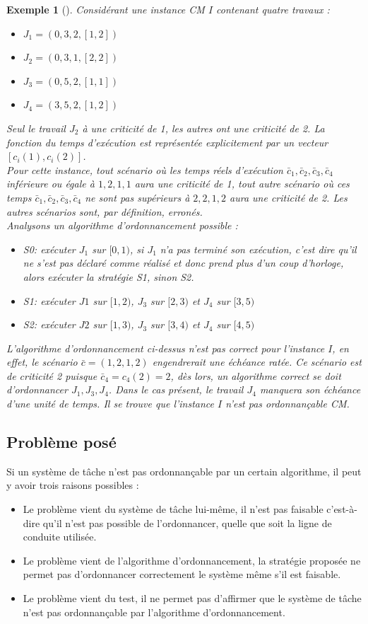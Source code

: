 \documentclass[a4paper]{report}
\theoremstyle{break}
\newtheorem{exem}{Exemple}
\theoremstyle{breakplain}
\begin{document}
\begin{exem}[\cite{baruah2010towards}]
Considérant une instance CM $I$ contenant quatre travaux :
\begin{itemize}
\item $J_1 = (0,3,2,[1,2])$
\item $J_2 = (0,3,1,[2,2])$
\item $J_3 = (0,5,2,[1,1])$
\item $J_4 = (3,5,2,[1,2])$
\end{itemize}
Seul le travail $J_2$ à une criticité de 1, les autres ont une criticité de 2. La fonction du temps d'exécution est représentée explicitement par un vecteur $[c_i(1), c_i(2)]$.\\
Pour cette instance, tout scénario où les temps réels d'exécution $\bar{c}_1,\bar{c}_2,\bar{c}_3,\bar{c}_4$ inférieure ou égale à $1,2,1,1$ aura une criticité de 1, tout autre scénario où ces temps $\bar{c}_1,\bar{c}_2,\bar{c}_3,\bar{c}_4$ ne sont pas supérieurs à $ 2,2,1,2$ aura une criticité de 2. Les autres scénarios sont, par définition, erronés.\\
Analysons un algorithme d'ordonnancement possible :
\begin{itemize}
\item S0: exécuter $J_1$ sur $[0,1)$, si $J_1$ n'a pas terminé son exécution, c'est dire qu'il ne s'est pas déclaré comme réalisé et donc prend plus d’un coup d'horloge, alors exécuter la stratégie S1, sinon S2.
\item S1: exécuter $J1$ sur $[1,2)$, $J_3$ sur $[2,3)$ et $J_4$ sur $[3,5)$
\item S2: exécuter $J2$ sur $[1,3)$, $J_3$ sur $[3,4)$ et $J_4$ sur $[4,5)$
\end{itemize}
L'algorithme d'ordonnancement ci-dessus n'est pas correct pour l'instance $I$, en effet, le scénario $\bar{c} = (1,2,1,2)$ engendrerait une échéance ratée. Ce scénario est de criticité 2 puisque $\bar{c}_4 = c_4(2) = 2$, dès lors, un algorithme correct se doit d'ordonnancer $J_1, J_3, J_4$. Dans le cas présent, le travail $J_4$ manquera son échéance d'une unité de temps. Il se trouve que l'instance $I$ n'est pas ordonnançable CM.
\end{exem}
\subsection{Problème posé}
Si un système de tâche n'est pas ordonnançable par un certain algorithme, il peut y avoir trois raisons possibles \cite{bakerbrute} :
\begin{itemize}
\item Le problème vient du système de tâche lui-même, il n'est pas faisable c'est-à-dire qu'il n'est pas possible de l'ordonnancer, quelle que soit la ligne de conduite utilisée.
\item Le problème vient de l'algorithme d'ordonnancement, la stratégie proposée ne permet pas d'ordonnancer correctement le système même s'il est faisable.
\item Le problème vient du test, il ne permet pas d'affirmer que le système de tâche n'est pas ordonnançable par l'algorithme d'ordonnancement.
\end{itemize}
\end{document}
